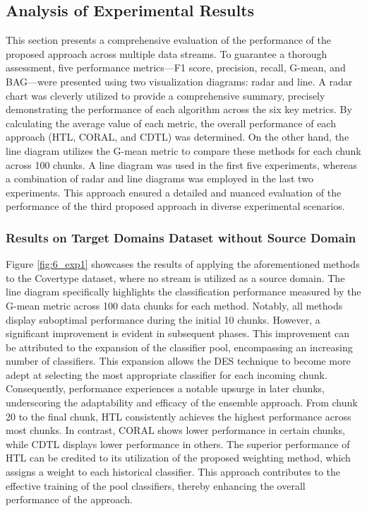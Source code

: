 \subsection{Analysis of Experimental Results}
This section presents a comprehensive evaluation of the performance of the proposed approach across multiple data streams. To guarantee a thorough assessment, five performance metrics—F1 score, precision, recall, G-mean, and BAG—were presented using two visualization diagrams: radar and line. A radar chart was cleverly utilized to provide a comprehensive summary, precisely demonstrating the performance of each algorithm across the six key metrics. By calculating the average value of each metric, the overall performance of each approach (HTL, CORAL, and CDTL) was determined. On the other hand, the line diagram utilizes the G-mean metric to compare these methods for each chunk across 100 chunks. A line diagram was used in the first five experiments, whereas a combination of radar and line diagrams was employed in the last two experiments. This approach ensured a detailed and nuanced evaluation of the performance of the third proposed approach in diverse experimental scenarios.

\subsubsection{Results on Target Domains Dataset without Source Domain}
Figure \ref{fig:6_exp1} showcases the results of applying the aforementioned methods to the Covertype dataset, where no stream is utilized as a source domain. The line diagram specifically highlights the classification performance measured by the G-mean metric across 100 data chunks for each method. Notably, all methods display suboptimal performance during the initial 10 chunks. However, a significant improvement is evident in subsequent phases. This improvement can be attributed to the expansion of the classifier pool, encompassing an increasing number of classifiers. This expansion allows the DES technique to become more adept at selecting the most appropriate classifier for each incoming chunk. Consequently, performance experiences a notable upsurge in later chunks, underscoring the adaptability and efficacy of the ensemble approach. From chunk 20 to the final chunk, HTL consistently achieves the highest performance across most chunks. In contrast, CORAL shows lower performance in certain chunks, while CDTL displays lower performance in others. The superior performance of HTL can be credited to its utilization of the proposed weighting method, which assigns a weight to each historical classifier. This approach contributes to the effective training of the pool classifiers, thereby enhancing the overall performance of the approach.

